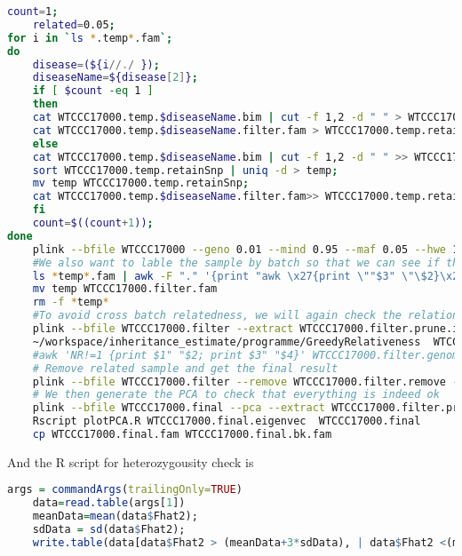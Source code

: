 \documentclass[12pt]{article}
\begin{document}
	\begin{lstlisting}[language=bash]
	count=1;
	related=0.05;
for i in `ls *.temp*.fam`;
do
	disease=(${i//./ });
	diseaseName=${disease[2]};
	if [ $count -eq 1 ] 
	then
	cat WTCCC17000.temp.$diseaseName.bim | cut -f 1,2 -d " " > WTCCC17000.temp.retainSnp;
	cat WTCCC17000.temp.$diseaseName.filter.fam > WTCCC17000.temp.retainSample;
	else
	cat WTCCC17000.temp.$diseaseName.bim | cut -f 1,2 -d " " >> WTCCC17000.temp.retainSnp;
	sort WTCCC17000.temp.retainSnp | uniq -d > temp;
	mv temp WTCCC17000.temp.retainSnp;
	cat WTCCC17000.temp.$diseaseName.filter.fam>> WTCCC17000.temp.retainSample;
	fi
	count=$((count+1));
done
	plink --bfile WTCCC17000 --geno 0.01 --mind 0.95 --maf 0.05 --hwe 1e-5 --keep WTCCC17000.temp.retainSample --extract WTCCC17000.temp.retainSnp --make-bed --out WTCCC17000.filter --indep 50 5 2 --threads 10
	#We also want to lable the sample by batch so that we can see if there is any batch problem
	ls *temp*.fam | awk -F "." '{print "awk \x27{print \""$3" \"\$2}\x27 "$0}' | bash |  awk 'NR==FNR{a[$2]=$1} NR!=FNR{print a[$2]" "$2" "$3" "$4" "$5" "$6}' - WTCCC17000.filter.fam > temp
	mv temp WTCCC17000.filter.fam
	rm -f *temp*
	#To avoid cross batch relatedness, we will again check the relationship between the samlpes
	plink --bfile WTCCC17000.filter --extract WTCCC17000.filter.prune.in --genome --min $related --out WTCCC17000.filter --threads 10 
	~/workspace/inheritance_estimate/programme/GreedyRelativeness  WTCCC17000.filter.genome > WTCCC17000.filter.remove;
	#awk 'NR!=1 {print $1" "$2; print $3" "$4}' WTCCC17000.filter.genome | sort | uniq > WTCCC17000.filter.remove;
	# Remove related sample and get the final result
	plink --bfile WTCCC17000.filter --remove WTCCC17000.filter.remove --threads 10 --geno 0.01 --mind 0.95 --maf 0.05 --hwe 1e-5 --make-bed --out WTCCC17000.final
	# We then generate the PCA to check that everything is indeed ok
	plink --bfile WTCCC17000.final --pca --extract WTCCC17000.filter.prune.in --out WTCCC17000.final --threads 10
	Rscript plotPCA.R WTCCC17000.final.eigenvec  WTCCC17000.final
	cp WTCCC17000.final.fam WTCCC17000.final.bk.fam
	\end{lstlisting}

	
	And the R script for heterozygousity check is
	\begin{lstlisting}[language=R]
	args = commandArgs(trailingOnly=TRUE)
	data=read.table(args[1])
	meanData=mean(data$Fhat2);
	sdData = sd(data$Fhat2);
	write.table(data[data$Fhat2 > (meanData+3*sdData), | data$Fhat2 <(meanData-3*sdData) ], args[2], quote=F, row.names=F, col.names=F)
	\end{lstlisting}
	
\end{document}
